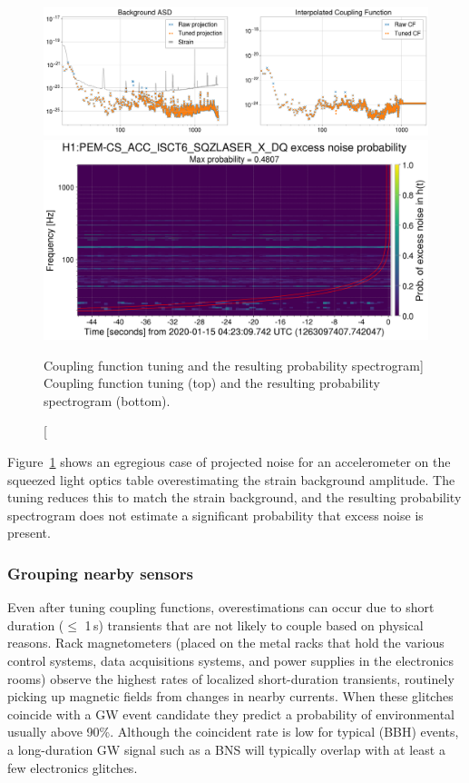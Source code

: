 \begin{figure}[h!]
	\includegraphics[width=\textwidth]{figures/noise-studies/vetting-tuning1.png}
	\includegraphics[width=\textwidth]{figures/noise-studies/vetting-tuning2.png}
	\caption
	[Coupling function tuning and the resulting probability spectrogram]
	{
		Coupling function tuning (top) and the resulting probability spectrogram (bottom).}
	\label{fig:vetting-tuning}
\end{figure}

Figure~\ref{fig:vetting-tuning} shows an egregious case of projected noise for an accelerometer on the squeezed light optics table overestimating the strain background amplitude.
The tuning reduces this to match the strain background, and the resulting probability spectrogram does not estimate a significant probability that excess noise is present.


\subsubsection{Grouping nearby sensors}

Even after tuning coupling functions, overestimations can occur due to short duration ($\leq$ 1\,s) transients that are not likely to couple based on physical reasons.
Rack magnetometers (placed on the metal racks that hold the various control systems, data acquisitions systems, and power supplies in the electronics rooms) observe the highest rates of localized short-duration transients, routinely picking up magnetic fields from changes in nearby currents.
When these glitches coincide with a \ac{GW} event candidate they predict a probability of environmental usually above 90\%.
Although the coincident rate is low for typical (\ac{BBH}) events, a long-duration \ac{GW} signal such as a \ac{BNS} will typically overlap with at least a few electronics glitches.

